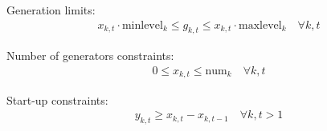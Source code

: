\documentclass{article}
\begin{document}
Generation limits:
\begin{align*}
x_{k,t} \cdot \text{minlevel}_k \leq g_{k,t} \leq x_{k,t} \cdot \text{maxlevel}_k \quad \forall k, t
\end{align*}

Number of generators constraints: 
\begin{align*}
0 \leq x_{k,t} \leq \text{num}_k \quad \forall k, t
\end{align*}

Start-up constraints:
\begin{align*}
y_{k,t} \geq x_{k,t} - x_{k,t-1} \quad \forall k, t > 1
\end{align*}
\end{document}
